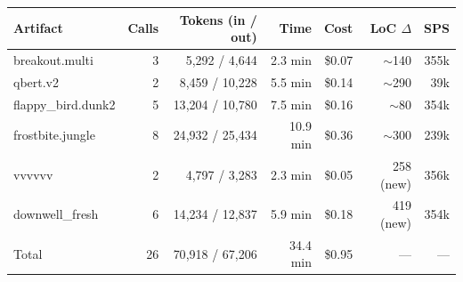 \begin{tabular}{lrrrrrr}
\toprule
Artifact & Calls & Tokens (in / out) & Time & Cost & LoC $\Delta$ & SPS \\
\midrule
breakout.multi & 3 & 5{,}292 / 4{,}644 & 2.3 min & \$0.07 & $\sim$140 & 355k \\
qbert.v2 & 2 & 8{,}459 / 10{,}228 & 5.5 min & \$0.14 & $\sim$290 & 39k \\
flappy\_bird.dunk2 & 5 & 13{,}204 / 10{,}780 & 7.5 min & \$0.16 & $\sim$80 & 354k \\
frostbite.jungle & 8 & 24{,}932 / 25{,}434 & 10.9 min & \$0.36 & $\sim$300 & 239k \\
vvvvvv & 2 & 4{,}797 / 3{,}283 & 2.3 min & \$0.05 & 258 (new) & 356k \\
downwell\_fresh & 6 & 14{,}234 / 12{,}837 & 5.9 min & \$0.18 & 419 (new) & 354k \\
\midrule
Total & 26 & 70{,}918 / 67{,}206 & 34.4 min & \$0.95 & --- & --- \\
\bottomrule
\end{tabular}

